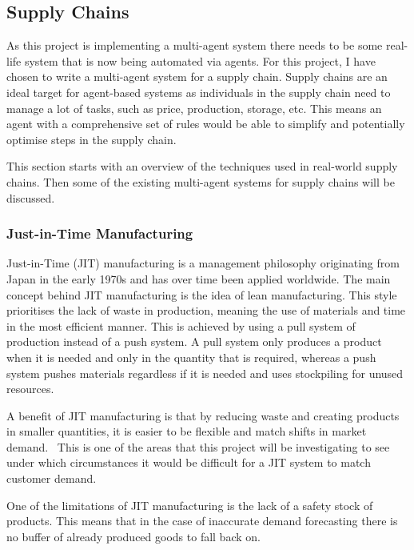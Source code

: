 \subsection{Supply Chains}

As this project is implementing a multi-agent system there needs to be some real-life system that is now being automated via agents.
For this project, I have chosen to write a multi-agent system for a supply chain.
Supply chains are an ideal target for agent-based systems as individuals in the supply chain need to manage a lot of tasks, such as price, production, storage, etc.
This means an agent with a comprehensive set of rules would be able to simplify and potentially optimise steps in the supply chain.

This section starts with an overview of the techniques used in real-world supply chains.
Then some of the existing multi-agent systems for supply chains will be discussed.

\subsubsection{Just-in-Time Manufacturing}

Just-in-Time (JIT) manufacturing is a management philosophy originating from Japan in the early 1970s and has over time been applied worldwide.
The main concept behind JIT manufacturing is the idea of lean manufacturing.
This style prioritises the lack of waste in production, meaning the use of materials and time in the most efficient manner.
This is achieved by using a pull system of production instead of a push system.
A pull system only produces a product when it is needed and only in the quantity that is required, whereas a push system pushes materials regardless if it is needed and uses stockpiling for unused resources.~\cite{javadian2013just}

A benefit of JIT manufacturing is that by reducing waste and creating products in smaller quantities, it is easier to be flexible and match shifts in market demand.~\cite{javadian2013just}
This is one of the areas that this project will be investigating to see under which circumstances it would be difficult for a JIT system to match customer demand.

One of the limitations of JIT manufacturing is the lack of a safety stock of products.
This means that in the case of inaccurate demand forecasting there is no buffer of already produced goods to fall back on.~\cite{javadian2013just}

